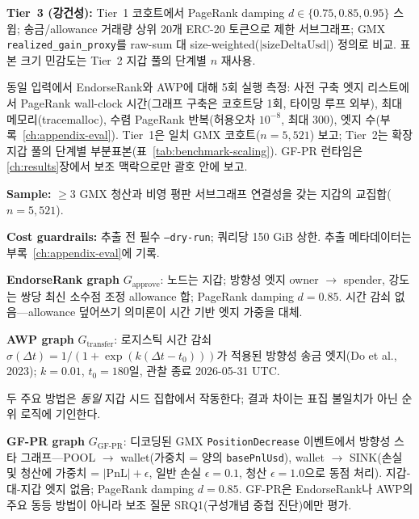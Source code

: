 \textbf{Tier~3 (강건성):} Tier~1 코호트에서 PageRank damping $d \in \{0.75, 0.85, 0.95\}$ 스윕; 송금/allowance 거래량 상위 20개 ERC-20 토큰으로 제한 서브그래프; GMX \texttt{realized\_gain\_proxy}를 raw-sum 대 size-weighted($|\text{sizeDeltaUsd}|$) 정의로 비교. 표본 크기 민감도는 Tier~2 지갑 풀의 단계별 $n$ 재사용.


동일 입력에서 EndorseRank와 AWP에 대해 5회 실행 측정: 사전 구축 엣지 리스트에서 PageRank wall-clock 시간(그래프 구축은 코호트당 1회, 타이밍 루프 외부), 최대 메모리(tracemalloc), 수렴 PageRank 반복(허용오차 $10^{-8}$, 최대 300), 엣지 수(부록~\ref{ch:appendix-eval}). Tier~1은 일치 GMX 코호트($n=5{,}521$) 보고; Tier~2는 확장 지갑 풀의 단계별 부분표본(표~\ref{tab:benchmark-scaling}). GF-PR 런타임은 \ref{ch:results}장에서 보조 맥락으로만 괄호 안에 보고.

\textbf{Sample:} $\geq 3$ GMX 청산과 비영 평판 서브그래프 연결성을 갖는 지갑의 교집합($n=5{,}521$).

\textbf{Cost guardrails:} 추출 전 필수 \texttt{--dry-run}; 쿼리당 150 GiB 상한. 추출 메타데이터는 부록~\ref{ch:appendix-eval}에 기록.


\textbf{EndorseRank graph} $G_{\text{approve}}$: 노드는 지갑; 방향성 엣지 owner $\to$ spender, 강도는 쌍당 최신 소수점 조정 allowance 합; PageRank damping $d=0.85$. 시간 감쇠 없음---allowance 덮어쓰기 의미론이 시간 기반 엣지 가중을 대체.

\textbf{AWP graph} $G_{\text{transfer}}$: 로지스틱 시간 감쇠 $\sigma(\Delta t) = 1/(1+\exp(k(\Delta t - t_0)))$가 적용된 방향성 송금 엣지(Do et al., 2023); $k=0.01$, $t_0=180$일, 관찰 종료 2026-05-31 UTC.

두 주요 방법은 \emph{동일} 지갑 시드 집합에서 작동한다; 결과 차이는 표집 불일치가 아닌 순위 로직에 기인한다.


\textbf{GF-PR graph} $G_{\text{GF-PR}}$: 디코딩된 GMX \texttt{PositionDecrease} 이벤트에서 방향성 스타 그래프---POOL $\to$ wallet(가중치 = 양의 \texttt{basePnlUsd}), wallet $\to$ SINK(손실 및 청산에 가중치 = $|\text{PnL}| + \epsilon$, 일반 손실 $\epsilon=0.1$, 청산 $\epsilon=1.0$으로 동점 처리). 지갑-대-지갑 엣지 없음; PageRank damping $d=0.85$. GF-PR은 EndorseRank나 AWP의 주요 동등 방법이 아니라 보조 질문 SRQ1(구성개념 중첩 진단)에만 평가.

